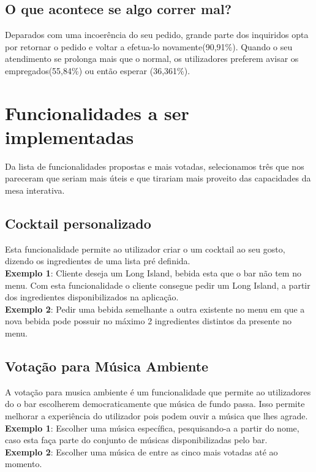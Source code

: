 \documentclass{article}
\begin{document}
\subsection*{O que acontece se algo correr mal?}
Deparados com uma incoerência do seu pedido, grande parte dos inquiridos opta por retornar o pedido e voltar a efetua-lo novamente(90,91\%). Quando o seu atendimento se prolonga mais que o normal, os utilizadores preferem avisar os empregados(55,84\%) ou então esperar (36,361\%).

\section*{Funcionalidades a ser implementadas}

Da lista de funcionalidades propostas e mais votadas, selecionamos três que nos pareceram que seriam mais úteis e que tirariam mais proveito das capacidades da mesa interativa.

\subsection*{Cocktail personalizado}
Esta funcionalidade permite ao utilizador criar o um cocktail ao seu gosto, dizendo os ingredientes de uma lista pré definida.\\
\textbf{Exemplo 1}: Cliente deseja um Long Island, bebida esta que o bar não tem no menu. Com esta funcionalidade o cliente consegue pedir um Long Island, a partir dos ingredientes disponibilizados na aplicação.\\
\textbf{Exemplo 2}: Pedir uma bebida semelhante a outra existente no menu em que a nova bebida pode possuir no máximo 2 ingredientes distintos da presente no menu. 
\\

\subsection*{Votação para Música Ambiente}
A votação para musica ambiente é um funcionalidade que permite ao utilizadores do o bar escolherem democraticamente que música de fundo passa. Isso permite melhorar a experiência do utilizador pois podem ouvir a música que lhes agrade.\\
\textbf{Exemplo 1}: Escolher uma música específica, pesquisando-a a partir do nome, caso esta faça parte do conjunto de músicas disponibilizadas pelo bar.\\
\textbf{Exemplo 2}: Escolher uma música de entre as cinco mais votadas até ao momento.\\
\end{document}
